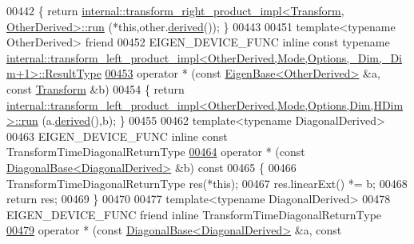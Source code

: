 \begin{DoxyCode}
00442 \textcolor{keyword}{  }\{ \textcolor{keywordflow}{return} \hyperlink{struct_eigen_1_1internal_1_1transform__right__product__impl}{internal::transform\_right\_product\_impl<Transform, OtherDerived>::run}
      (*\textcolor{keyword}{this},other.\hyperlink{group___core___module_a324b16961a11d2ecfd2d1b7dd7946545}{derived}()); \}
00443 
00451   \textcolor{keyword}{template}<\textcolor{keyword}{typename} OtherDerived> \textcolor{keyword}{friend}
00452   EIGEN\_DEVICE\_FUNC \textcolor{keyword}{inline} \textcolor{keyword}{const} \textcolor{keyword}{typename} 
      \hyperlink{struct_eigen_1_1internal_1_1transform__left__product__impl}{internal::transform\_left\_product\_impl<OtherDerived,Mode,Options,\_Dim,\_Dim+1>::ResultType}
\hyperlink{group___geometry___module_ab87ba80761e1f32166253856b7a360e8}{00453}     operator * (\textcolor{keyword}{const} \hyperlink{group___core___module_struct_eigen_1_1_eigen_base}{EigenBase<OtherDerived>} &a, \textcolor{keyword}{const} 
      \hyperlink{group___geometry___module_class_eigen_1_1_transform}{Transform} &b)
00454   \{ \textcolor{keywordflow}{return} 
      \hyperlink{struct_eigen_1_1internal_1_1transform__left__product__impl}{internal::transform\_left\_product\_impl<OtherDerived,Mode,Options,Dim,HDim>::run}
      (a.\hyperlink{group___core___module_a324b16961a11d2ecfd2d1b7dd7946545}{derived}(),b); \}
00455 
00462   \textcolor{keyword}{template}<\textcolor{keyword}{typename} DiagonalDerived>
00463   EIGEN\_DEVICE\_FUNC \textcolor{keyword}{inline} \textcolor{keyword}{const} TransformTimeDiagonalReturnType
\hyperlink{group___geometry___module_a4f566a9fef984636431d6d5ebea0ba67}{00464}     operator * (\textcolor{keyword}{const} \hyperlink{class_eigen_1_1_diagonal_base}{DiagonalBase<DiagonalDerived>} &b)\textcolor{keyword}{ const}
00465 \textcolor{keyword}{  }\{
00466     TransformTimeDiagonalReturnType res(*\textcolor{keyword}{this});
00467     res.linearExt() *= b;
00468     \textcolor{keywordflow}{return} res;
00469   \}
00470 
00477   \textcolor{keyword}{template}<\textcolor{keyword}{typename} DiagonalDerived>
00478   EIGEN\_DEVICE\_FUNC \textcolor{keyword}{friend} \textcolor{keyword}{inline} TransformTimeDiagonalReturnType
\hyperlink{group___geometry___module_a1ee8a506136a4ac8084b2913cc249ec8}{00479}     operator * (\textcolor{keyword}{const} \hyperlink{class_eigen_1_1_diagonal_base}{DiagonalBase<DiagonalDerived>} &a, \textcolor{keyword}{const} 

\end{DoxyCode}
